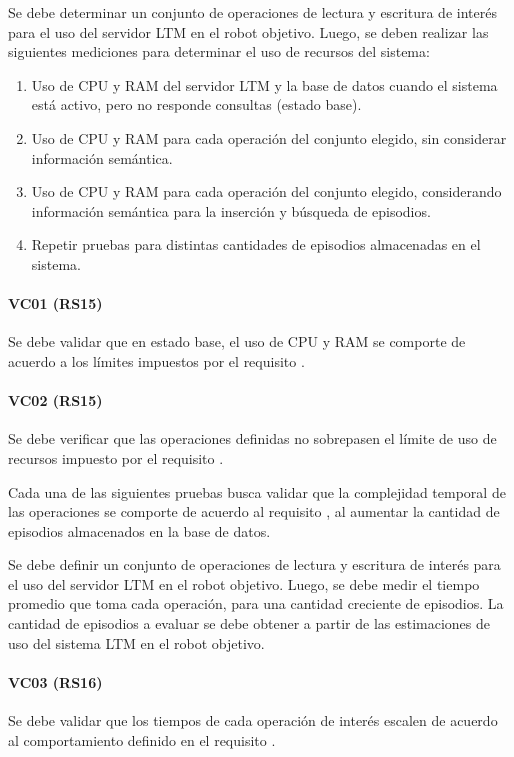 Se debe determinar un conjunto de operaciones de lectura y escritura de interés para el uso del servidor LTM en el robot objetivo. Luego, se deben realizar las siguientes mediciones para determinar el uso de recursos del sistema:
\begin{enumerate}
	\item Uso de CPU y RAM del servidor LTM y la base de datos cuando el sistema está activo, pero no responde consultas (estado base).
	\item Uso de CPU y RAM para cada operación del conjunto elegido, sin considerar información semántica.
	\item Uso de CPU y RAM para cada operación del conjunto elegido, considerando información semántica para la inserción y búsqueda de episodios.
	\item Repetir pruebas para distintas cantidades de episodios almacenadas en el sistema.
\end{enumerate}

\paragraph{VC01 (RS15)}
Se debe validar que en estado base, el uso de CPU y RAM se comporte de acuerdo a los límites impuestos por el requisito .

\paragraph{VC02 (RS15)}
Se debe verificar que las operaciones definidas no sobrepasen el límite de uso de recursos impuesto por el requisito .


Cada una de las siguientes pruebas busca validar que la complejidad temporal de las operaciones se comporte de acuerdo al requisito , al aumentar la cantidad de episodios almacenados en la base de datos. 

Se debe definir un conjunto de operaciones de lectura y escritura de interés para el uso del servidor LTM en el robot objetivo. Luego, se debe medir el tiempo promedio que toma cada operación, para una cantidad creciente de episodios. La cantidad de episodios a evaluar se debe obtener a partir de las estimaciones de uso del sistema LTM en el robot objetivo.

\paragraph{VC03 (RS16)}
Se debe validar que los tiempos de cada operación de interés escalen de acuerdo al comportamiento definido en el requisito .

